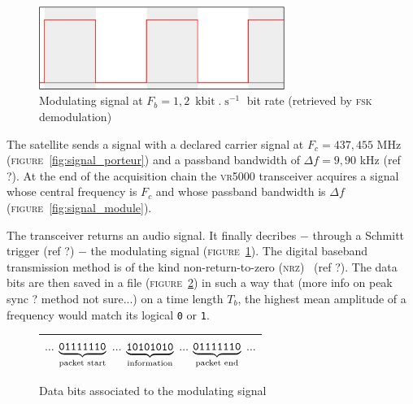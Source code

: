 \documentclass[a4paper]{report}
\begin{document}
\begin{figure}[h]
  \begin{center}
  \includegraphics[width=8cm]{pictures/signal_demod.png}
  \end{center}
  \caption{Modulating signal at $F_b = 1,2 \ \operatorname{kbit}.\operatorname{s}^{-1}$ bit rate (retrieved by \textsc{fsk} demodulation)}
  \label{fig:signal_modulant}
\end{figure}

The satellite sends a signal with a declared carrier signal at $F_c = 437,455$ MHz (\textsc{figure}~\ref{fig:signal_porteur}) and a passband bandwidth of $\Delta f = 9,90$ kHz (ref ?). At the end of the acquisition chain the \textsc{vr5000} transceiver acquires a signal whose central frequency is $F_c$ and whose passband bandwidth is $\Delta f$ (\textsc{figure}~\ref{fig:signal_module}).

The transceiver returns an audio signal. It finally decribes $-$ through a Schmitt trigger (ref ?) $-$ the modulating signal (\textsc{figure}~\ref{fig:signal_modulant}). The digital baseband transmission method is of the kind non-return-to-zero (\textsc{nrz})~\cite{nrz_gorry} (ref ?). The data bits are then saved in a file (\textsc{figure}~\ref{fig:bits_donnees}) in such a way that (more info on peak sync ? method not sure...) on a time length $T_b$, the highest mean amplitude of a frequency would match its logical \texttt{0} or \texttt{1}.


\begin{figure}[h]
  \begin{center}
  \begin{tabular}{|c|}
    \hline
    $\dots$
    \textcolor{rltred}{$\underbrace{\texttt{01111110}}_{\textup{packet start}}$}
    $\dots$
    \textcolor{rltgreen}{$\underbrace{\texttt{10101010}}_{\textup{information}}$}
    $\dots$
    \textcolor{rltred}{$\underbrace{\texttt{01111110}}_{\textup{packet end}}$}
    $\dots$\\
    \hline
  \end{tabular}
  \end{center}
\caption{Data bits associated to the modulating signal}
\label{fig:bits_donnees}
\end{figure}
\end{document}
